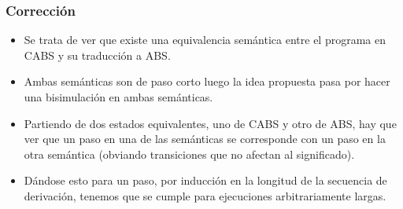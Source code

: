\documentclass[spanish, a4paper, 12pt, final, slideColor, nototal, colorBG, pdf, noaccumulate, darkblue] {beamer}
\begin{document}
\begin{frame}[fragile]
  \frametitle{Corrección}
  \begin{itemize}
  \item Se trata de ver que existe una equivalencia semántica entre el programa en CABS y su traducción a ABS.
  \item Ambas semánticas son de paso corto luego la idea propuesta pasa por hacer una bisimulación en ambas semánticas.
  \item Partiendo de dos estados equivalentes, uno de CABS y otro de ABS, hay que ver que un paso en una de las semánticas se corresponde con un paso en la otra semántica (obviando transiciones que no afectan al significado).
  \item Dándose esto para un paso, por inducción en la longitud de la secuencia de derivación, tenemos que se cumple para ejecuciones arbitrariamente largas.
  \end{itemize}
\end{frame}
\end{document}
